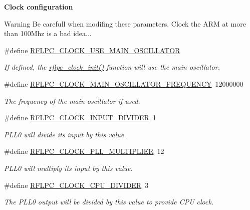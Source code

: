 \begin{Indent}{\bf Clock configuration}
{\begin{DoxyWarning}{Warning}
Be carefull when modifing these parameters. Clock the A\-R\-M at more than 100\-Mhz is a bad idea... 
\end{DoxyWarning}
}\begin{DoxyCompactItemize}
\item 
\#define \hyperlink{group__config_ga613aee18f230b92f06a5c3edf1c0eb8d}{R\-F\-L\-P\-C\-\_\-\-C\-L\-O\-C\-K\-\_\-\-U\-S\-E\-\_\-\-M\-A\-I\-N\-\_\-\-O\-S\-C\-I\-L\-L\-A\-T\-O\-R}
\begin{DoxyCompactList}\small\item\em If defined, the \hyperlink{group__clock_ga00ad4cbad1cd13962e283bdfb3451f7f}{rflpc\-\_\-clock\-\_\-init()} function will use the main oscillator. \end{DoxyCompactList}\item 
\#define \hyperlink{group__config_ga1aca349fddc5e309a59773326d84357e}{R\-F\-L\-P\-C\-\_\-\-C\-L\-O\-C\-K\-\_\-\-M\-A\-I\-N\-\_\-\-O\-S\-C\-I\-L\-L\-A\-T\-O\-R\-\_\-\-F\-R\-E\-Q\-U\-E\-N\-C\-Y}~12000000
\begin{DoxyCompactList}\small\item\em The frequency of the main oscillator if used. \end{DoxyCompactList}\item 
\#define \hyperlink{group__config_ga896b4d9a201a8f3350e8a2827e389edd}{R\-F\-L\-P\-C\-\_\-\-C\-L\-O\-C\-K\-\_\-\-I\-N\-P\-U\-T\-\_\-\-D\-I\-V\-I\-D\-E\-R}~1
\begin{DoxyCompactList}\small\item\em P\-L\-L0 will divide its input by this value. \end{DoxyCompactList}\item 
\#define \hyperlink{group__config_ga512c5ec1b384b35110da196912f42548}{R\-F\-L\-P\-C\-\_\-\-C\-L\-O\-C\-K\-\_\-\-P\-L\-L\-\_\-\-M\-U\-L\-T\-I\-P\-L\-I\-E\-R}~12
\begin{DoxyCompactList}\small\item\em P\-L\-L0 will multiply its input by this value. \end{DoxyCompactList}\item 
\#define \hyperlink{group__config_ga90b12dedcc59811400db87190281f77f}{R\-F\-L\-P\-C\-\_\-\-C\-L\-O\-C\-K\-\_\-\-C\-P\-U\-\_\-\-D\-I\-V\-I\-D\-E\-R}~3
\begin{DoxyCompactList}\small\item\em The P\-L\-L0 output will be divided by this value to provide C\-P\-U clock. \end{DoxyCompactList}\end{DoxyCompactItemize}
\end{Indent}
